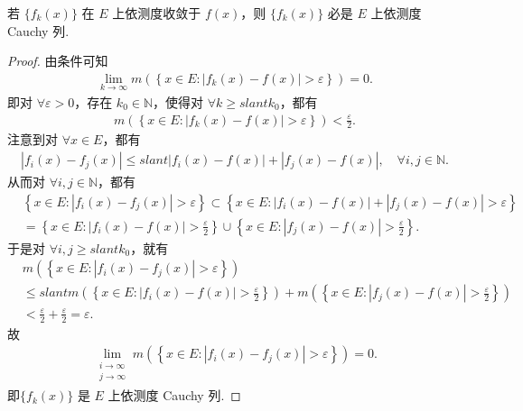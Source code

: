 \documentclass[../../main.tex]{subfiles}
\begin{document}
\begin{theorem}\label{theorem:依测度收敛必是依测度Cauchy列}
若 $\{f_k(x)\}$ 在 $E$ 上依测度收敛于 $f(x)$，则 $\{f_k(x)\}$ 必是 $E$ 上依测度 Cauchy 列.
\end{theorem}
\begin{proof}
由条件可知
\begin{align*}
\lim_{k\rightarrow\infty}m\left(\left\{x\in E:\left|f_k(x)-f(x)\right|>\varepsilon\right\}\right)=0.
\end{align*}
即对 $\forall\varepsilon > 0$，存在 $k_0\in\mathbb{N}$，使得对 $\forall k\geqslant slant k_0$，都有
\begin{align*}
m\left(\left\{x\in E:\left|f_k(x)-f(x)\right|>\varepsilon\right\}\right)<\frac{\varepsilon}{2}.
\end{align*}
注意到对 $\forall x\in E$，都有
\begin{align*}
\left|f_i(x)-f_j(x)\right|\leqslant slant\left|f_i(x)-f(x)\right|+\left|f_j(x)-f(x)\right|,\quad\forall i,j\in\mathbb{N}.
\end{align*}
从而对 $\forall i,j\in\mathbb{N}$，都有
\begin{align*}
&\left\{x\in E:\left|f_i(x)-f_j(x)\right|>\varepsilon\right\}\subset\left\{x\in E:\left|f_i(x)-f(x)\right|+\left|f_j(x)-f(x)\right|>\varepsilon\right\}\\
&=\left\{x\in E:\left|f_i(x)-f(x)\right|>\frac{\varepsilon}{2}\right\}\cup\left\{x\in E:\left|f_j(x)-f(x)\right|>\frac{\varepsilon}{2}\right\}.
\end{align*}
于是对 $\forall i,j\geqslant slant k_0$，就有
\begin{align*}
&m\left(\left\{x\in E:\left|f_i(x)-f_j(x)\right|>\varepsilon\right\}\right)\\
&\leqslant slant m\left(\left\{x\in E:\left|f_i(x)-f(x)\right|>\frac{\varepsilon}{2}\right\}\right)+m\left(\left\{x\in E:\left|f_j(x)-f(x)\right|>\frac{\varepsilon}{2}\right\}\right)\\
&<\frac{\varepsilon}{2}+\frac{\varepsilon}{2}=\varepsilon.
\end{align*}
故
\begin{align*}
\lim_{\substack{i\rightarrow\infty\\j\rightarrow\infty}}m\left(\left\{x\in E:\left|f_i(x)-f_j(x)\right|>\varepsilon\right\}\right)=0.
\end{align*}
即$\{f_k(x)\}$ 是 $E$ 上依测度 Cauchy 列.
\end{proof}
\end{document}
